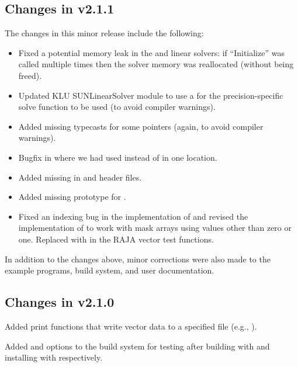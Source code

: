 \subsection*{Changes in v2.1.1}

The changes in this minor release include the following:
\begin{itemize}
\item Fixed a potential memory leak in the {\spgmr} and {\spfgmr} linear
  solvers: if ``Initialize'' was called multiple times then the solver
  memory was reallocated (without being freed).
  
\item Updated KLU SUNLinearSolver module to use a  for the
  precision-specific solve function to be used (to avoid compiler 
  warnings).  

\item Added missing typecasts for some  pointers (again, to
  avoid compiler warnings). 

\item Bugfix in  where we had used 
  instead of  in one location.

\item Added missing  in {\nvector} and {\sunmatrix}
  header files.

\item Added missing prototype for .

\item Fixed an indexing bug in the {\cuda} {\nvector} implementation of
   and revised the {\raja} {\nvector} implementation of
   to work with mask arrays using values other than zero or
  one. Replaced  with  in the RAJA vector test functions.
\end{itemize}
In addition to the changes above, minor corrections were also made to the
example programs, build system, and user documentation.

\subsection*{Changes in v2.1.0}

Added {\nvector} print functions that write vector data to a specified
file (e.g., ).

Added  and  options to the build
system for testing {\sundials} after building with  and
installing with  respectively.

